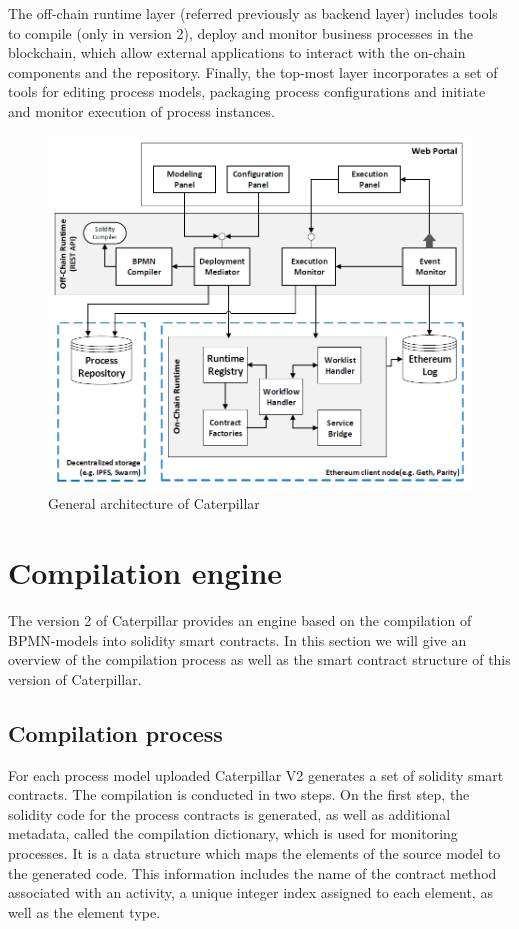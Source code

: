 The off-chain runtime layer (referred previously as backend layer) includes tools to compile (only in version 2), deploy and monitor business processes in the blockchain, which allow external applications to interact with the on-chain components and the repository. Finally, the top-most layer incorporates a set of tools for editing process models, packaging process configurations and initiate and monitor execution of process instances.

\begin{figure}[hbt]
	\includegraphics[width=\textwidth]{gfx/caterpillar-architecture}
	\caption{General architecture of Caterpillar}
	\label{fig:caterpillar:overview:architecture}
\end{figure}

\section{Compilation engine}
\label{sec:caterpillar:v2}

The version 2 of Caterpillar provides an engine based on the compilation of BPMN-models into solidity smart contracts. In this section we will give an overview of the compilation process as well as the smart contract structure of this version of Caterpillar.

\subsection{Compilation process}
\label{sec:caterpillar:v2:compilation}
For each process model uploaded Caterpillar V2 generates a set of solidity smart contracts. The compilation is conducted in two steps. On the first step, the solidity code for the process contracts is generated, as well as additional metadata, called the compilation dictionary, which is used for monitoring processes. It is a data structure which maps the elements of the source model to the generated code. This information includes the name of the contract method associated with an activity, a unique integer index assigned to each element, as well as the element type.

